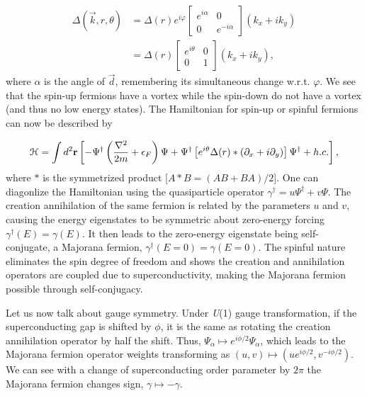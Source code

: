 \begin{align}
  \Delta (\vec{k},r,\theta) &= \Delta(r) e^{i\varphi}
  \begin{bmatrix}
    e^{i\alpha} & 0 \\
    0 & e^{-i\alpha}
  \end{bmatrix}
  (k_x + i k_y) \nonumber \\
  &= \Delta(r)
  \begin{bmatrix}
    e^{i\theta} & 0 \\
    0 & 1
  \end{bmatrix}
  (k_x + i k_y),
\end{align}
where $\alpha$ is the angle of $\vec{d}$, remembering its simultaneous change w.r.t. $\varphi$.
We see that the spin-up fermions have a vortex while the spin-down do not have a vortex (and thus no low energy states).
The Hamiltonian for spin-up or spinful fermions can now be described by

\begin{equation}
  \mathcal{H} = \int d^2 \mathbf{r} \left[ -\Psi^{\dagger} \left( \dfrac{\nabla^2}{2m} + \epsilon_F \right) \Psi + \Psi^{\dagger} \left[ e^{i\theta} \Delta(r) * \left( \partial_x +i\partial_y \right) \right] \Psi^{\dagger} + h.c. \right],
\end{equation}
where $*$ is the symmetrized product
[$A*B = (AB + BA) / 2$].
One can diagonlize the Hamiltonian using the quasiparticle operator
$\gamma^{\dagger} = u\Psi^{\dagger} + v\Psi$.
The creation annihilation of the same fermion is related by the parameters $u$ and $v$, causing the energy eigenstates to be symmetric about zero-energy forcing
$\gamma^{\dagger}(E) = \gamma (E)$.
It then leads to the zero-energy eigenstate being self-conjugate, a Majorana fermion,
$\gamma^{\dagger}(E=0) = \gamma (E=0)$.
The spinful nature eliminates the spin degree of freedom and shows the creation and annihilation operators are coupled due to superconductivity, making the Majorana fermion possible through self-conjugacy.

Let us now talk about gauge symmetry.
Under \textit{U}(1) gauge transformation, if the superconducting gap is shifted by $\phi$, it is the same as rotating the creation annihilation operator by half the shift.
Thus, $\Psi_{\alpha} \mapsto e^{i\phi/2} \Psi_{\alpha}$, which leads to the Majorana fermion operator weights transforming as $(u,v) \mapsto (ue^{i\phi/2}, v^{-i\phi/2})$.
We can see with a change of superconducting order parameter by $2\pi$ the Majorana fermion changes sign, $\gamma \mapsto -\gamma$.

